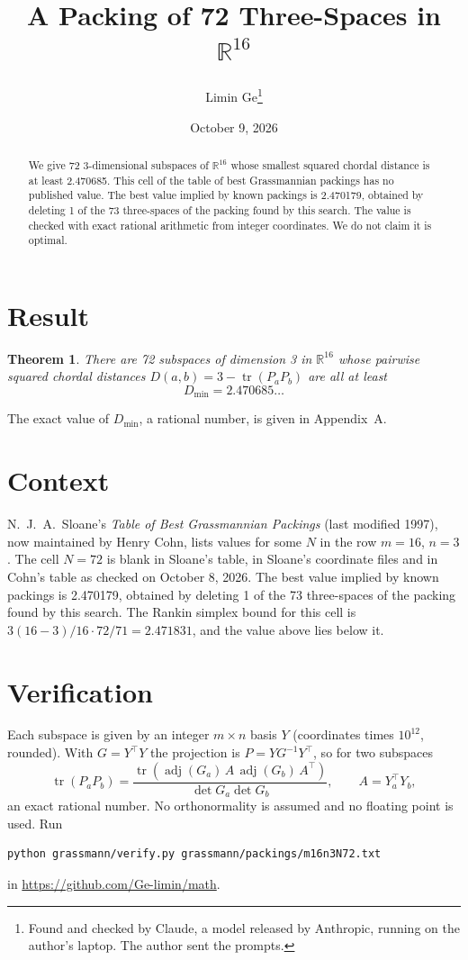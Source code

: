 \documentclass[11pt,a4paper]{article}
\title{A Packing of 72 Three-Spaces in $\mathbb{R}^{16}$}
\author{Limin Ge\thanks{Found and checked by Claude, a model released by Anthropic, running on the author's laptop. The author sent the prompts.}}
\date{October 9, 2026}
\newtheorem*{theorem}{Theorem}
\begin{document}
\maketitle
\begin{abstract}
We give 72 3-dimensional subspaces of $\mathbb{R}^{16}$ whose smallest squared chordal distance is at least 2.470685. This cell of the table of best Grassmannian packings has no published value. The best value implied by known packings is 2.470179, obtained by deleting 1 of the 73 three-spaces of the packing found by this search. The value is checked with exact rational arithmetic from integer coordinates. We do not claim it is optimal.
\end{abstract}

\section{Result}
\begin{theorem}
There are 72 subspaces of dimension 3 in $\mathbb{R}^{16}$ whose pairwise squared chordal distances $D(a,b) = 3 - \operatorname{tr}(P_aP_b)$ are all at least
\[ D_{\min} = 2.470685\ldots \]
\end{theorem}
The exact value of $D_{\min}$, a rational number, is given in Appendix~A.


\section{Context}
N.~J.~A.~Sloane's \emph{Table of Best Grassmannian Packings} (last modified 1997), now maintained by Henry Cohn, lists values for some $N$ in the row $m=16$, $n=3$. The cell $N=72$ is blank in Sloane's table, in Sloane's coordinate files and in Cohn's table as checked on October 8, 2026. The best value implied by known packings is 2.470179, obtained by deleting 1 of the 73 three-spaces of the packing found by this search. The Rankin simplex bound for this cell is $3(16-3)/16\cdot 72/71 = 2.471831$, and the value above lies below it.


\section{Verification}
Each subspace is given by an integer $m\times n$ basis $Y$ (coordinates times $10^{12}$, rounded). With $G=Y^\top Y$ the projection is $P=YG^{-1}Y^\top$, so for two subspaces
\[ \operatorname{tr}(P_aP_b)=\frac{\operatorname{tr}(\operatorname{adj}(G_a)\,A\,\operatorname{adj}(G_b)\,A^\top)}{\det G_a\det G_b},\qquad A=Y_a^\top Y_b, \]
an exact rational number. No orthonormality is assumed and no floating point is used. Run
\begin{verbatim}
python grassmann/verify.py grassmann/packings/m16n3N72.txt
\end{verbatim}
in \url{https://github.com/Ge-limin/math}.
\end{document}
